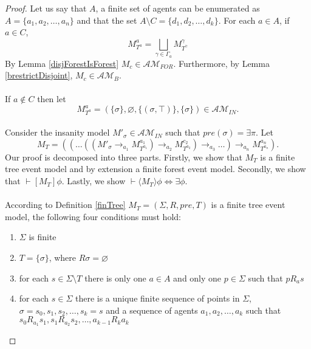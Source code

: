 \documentclass[12pt, a4paper, titlepage]{scrartcl}
\numberwithin{equation}{section}
\newcommand{\sqex}[1]{[{#1}]}
\newcommand{\anex}[1]{\langle {#1} \rangle}
\newcommand{\eventClass}{\mathcal{AM}}
\newcommand{\insaneClass}{\eventClass_{IN}}
\newcommand{\forestClass}{\eventClass_{FOR}}
\begin{document}
\begin{proof}
Let us say that $A$, a finite set of agents can be enumerated as $A = \{ a_1, a_2, \ldots, a_n\}$
and that the set $A \setminus C = \{d_1, d_2, \ldots, d_k\}$.
For each $a \in A$, if $a \in C$,
\[
	M^a_{T^a} = \bigsqcup_{\gamma \in \Gamma_a} M^\gamma_{T^\gamma}
\]
By Lemma \ref{disjForestIsForest} $M_c \in \forestClass$.
Furthermore, by Lemma \ref{brestrictDisjoint}, $M_c \in \eventClass_B$.\\
\\
If $a \notin C$ then let
\[
	M^a_{T^a} = (\{\sigma\}, \varnothing, \{(\sigma, \top)\}, \{\sigma\}) \in \insaneClass.
\]
\\
Consider the insanity model $M'_\sigma \in \insaneClass$ such that $pre(\sigma) =
\exists \pi$.
Let
\[
M_T = ((\ldots((M'_\sigma \to_{a_1} M^{a_1}_{T^{a_1}}) \to_{a_2} M^{c_2}_{T^{a_2}}) \to_{a_3} \ldots )
		\to_{a_n} M^{a_n}_{T^{a_n}}).
\]
Our proof is decomposed into three parts.
Firstly, we show that $M_T$ is a finite tree event model and by extension a finite forest event
model.
Secondly, we show that $\vdash \sqex{M_T} \phi$.
Lastly, we show $\vdash \anex{ M_T } \phi \iff \exists \phi$.\\
\\
According to Definition \ref{finTree} $M_T = (\Sigma, R, pre, T)$ is a finite tree event model, the following four conditions must hold:
\begin{enumerate}
	\item $\Sigma$ is finite \label{treeConFinite}
	\item $T = \{\sigma\}$, where $R \sigma = \varnothing$ \label{treeConRoot}
	\item for each $s \in \Sigma \setminus T$ there is only one $a \in A$ and only one $p \in \Sigma$
	such that $p R_a s$ \label{treeConOneAgent}
	\item for each $s \in \Sigma$ there is a unique finite sequence of points in $\Sigma$, $\sigma =
	s_0, s_1, s_2, \ldots, s_k = s$ and a sequence of agents $a_1, a_2, \ldots, a_k$ such that $s_0
	R_{a_1} s_1, s_1 R_{a_2} s_2, \ldots, a_{k-1} R_k
	a_k$ \label{treeConUniquePath}
\end{enumerate}


\end{proof}
\end{document}

